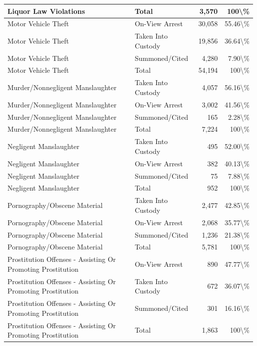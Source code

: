 \documentclass[
]{krantz}
\begin{document}
\begin{longtable}[t]{l|l|r|r}
\hline
Liquor Law Violations & Total & 3,570 & 100\textbackslash{}\%\\
\hline
Motor Vehicle Theft & On-View Arrest & 30,058 & 55.46\textbackslash{}\%\\
\hline
Motor Vehicle Theft & Taken Into Custody & 19,856 & 36.64\textbackslash{}\%\\
\hline
Motor Vehicle Theft & Summoned/Cited & 4,280 & 7.90\textbackslash{}\%\\
\hline
Motor Vehicle Theft & Total & 54,194 & 100\textbackslash{}\%\\
\hline
Murder/Nonnegligent Manslaughter & Taken Into Custody & 4,057 & 56.16\textbackslash{}\%\\
\hline
Murder/Nonnegligent Manslaughter & On-View Arrest & 3,002 & 41.56\textbackslash{}\%\\
\hline
Murder/Nonnegligent Manslaughter & Summoned/Cited & 165 & 2.28\textbackslash{}\%\\
\hline
Murder/Nonnegligent Manslaughter & Total & 7,224 & 100\textbackslash{}\%\\
\hline
Negligent Manslaughter & Taken Into Custody & 495 & 52.00\textbackslash{}\%\\
\hline
Negligent Manslaughter & On-View Arrest & 382 & 40.13\textbackslash{}\%\\
\hline
Negligent Manslaughter & Summoned/Cited & 75 & 7.88\textbackslash{}\%\\
\hline
Negligent Manslaughter & Total & 952 & 100\textbackslash{}\%\\
\hline
Pornography/Obscene Material & Taken Into Custody & 2,477 & 42.85\textbackslash{}\%\\
\hline
Pornography/Obscene Material & On-View Arrest & 2,068 & 35.77\textbackslash{}\%\\
\hline
Pornography/Obscene Material & Summoned/Cited & 1,236 & 21.38\textbackslash{}\%\\
\hline
Pornography/Obscene Material & Total & 5,781 & 100\textbackslash{}\%\\
\hline
Prostitution Offenses - Assisting Or Promoting Prostitution & On-View Arrest & 890 & 47.77\textbackslash{}\%\\
\hline
Prostitution Offenses - Assisting Or Promoting Prostitution & Taken Into Custody & 672 & 36.07\textbackslash{}\%\\
\hline
Prostitution Offenses - Assisting Or Promoting Prostitution & Summoned/Cited & 301 & 16.16\textbackslash{}\%\\
\hline
Prostitution Offenses - Assisting Or Promoting Prostitution & Total & 1,863 & 100\textbackslash{}\%\\

\end{longtable}
\end{document}

